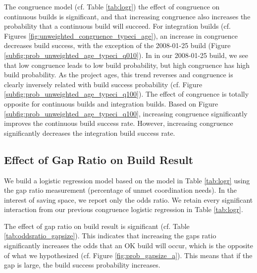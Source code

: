 The congruence model (cf. Table \ref{tab:logr}) the effect of congruence on continuous builds is significant, and that increasing congruence also increases the probability that a continuous build will succeed. 
For integration builds (cf. Figures \ref{fig:unweighted_congruence_typeci_age}), an increase in congruence decreases build success, with the exception of the 2008-01-25 build (Figure \ref{subfig:prob_unweighted_age_typeci_q010}). In in our 2008-01-25 build, we see that low congruence leads to low build probability, but high congruence has high build probability. As the project ages, this trend reverses and congruence is clearly inversely related with build success probability (cf. Figure \ref{subfig:prob_unweighted_age_typeci_q100}).
The effect of congruence is totally opposite for continuous builds and integration builds. Based on Figure \ref{subfig:prob_unweighted_age_typeci_q100}, increasing congruence significantly improves the continuous build success rate. However, increasing congruence significantly decreases the integration build success rate.


\subsection{Effect of Gap Ratio on Build Result}
\label{sec:gapsizeresult}
We build a logistic regression model based on the model in Table \ref{tab:logr} using the gap ratio measurement (percentage of unmet coordination needs). In the interest of saving space, we report only the odds ratio. We retain every significant interaction from our previous congruence logistic regression in Table \ref{tab:logr}.

The effect of gap ratio on build result is significant (cf. Table \ref{tab:oddsratio_gapsize}). This indicates that increasing the gaps ratio significantly increases the odds that an OK build will occur, which is the opposite of what we hypothesized (cf. Figure \ref{fig:prob_gapsize_a}). This means that if the gap is large, the build success probability increases.

